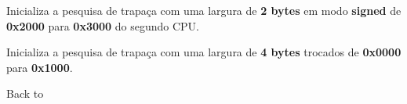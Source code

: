 \documentclass[letterpaper,10pt,brazil]{sphinxmanual}
\begin{document}
\begin{DUlineblock}{0em}
\begin{DUlineblock}{\DUlineblockindent}
\item[] 
\end{DUlineblock}
\item[] Inicializa a pesquisa de trapaça com uma largura de \textbf{2 bytes} em modo \textbf{signed} de \textbf{0x2000} para \textbf{0x3000} do segundo CPU.
\item[] 
\item[]
\begin{DUlineblock}{\DUlineblockindent}
\item[] 
\item[] 
\end{DUlineblock}
\item[] Inicializa a pesquisa de trapaça com uma largura de \textbf{4 bytes} trocados de \textbf{0x0000} para \textbf{0x1000}.
\item[] 
\item[] Back to {\hyperref[debugger/cheats:debugger\string-cheats\string-list]{}}
\end{DUlineblock}
\begin{quote}
\label{debugger/cheats:debugger-command-cheatrange}\end{quote}
\end{document}
